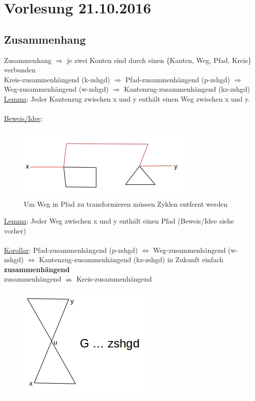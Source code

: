 \section{Vorlesung 21.10.2016}
\subsection{Zusammenhang}
Zusammenhang $\Rightarrow$ je zwei Konten sind durch einen \{Kanten, Weg, Pfad, Kreis\} verbunden\\
Kreis-zusammenhängend (k-zshgd) $\Rightarrow$ Pfad-zusammenhängend (p-zshgd) $\Rightarrow$ Weg-zusammenhängend (w-zshgd) $\Rightarrow$ Kantenzug-zusammenhängend (kz-zshgd)\\

\underline{Lemma}: Jeder Kantenzug zwischen x und y enthält einen Weg zwischen x und y.
\\\\
\underline{Beweis/Idee}:\\
\begin{figure}[htp]
\centering
\includegraphics[scale=1.00]{lectures/161021/pix/pic1.jpg}\\
Um Weg in Pfad zu transformieren müssen Zyklen entfernt werden
\end{figure}

\underline{Lemma}: Jeder Weg zwischen x und y enthält einen Pfad (Beweis/Idee siehe vorher)
\\\\
\underline{Korollar}: Pfad-zusammenhängend (p-zshgd) $\Leftrightarrow$ Weg-zusammenhängend (w-zshgd) $\Leftrightarrow$ Kantenzug-zusammenhängend (kz-zshgd) in Zukunft einfach \textbf{zusammenhängend}\\

zusammenhängend $\nRightarrow$ Kreis-zusammenhängend
\begin{figure}[htp]
\centering
\includegraphics[scale=1.00]{lectures/161021/pix/pic2.jpg}
\end{figure}

